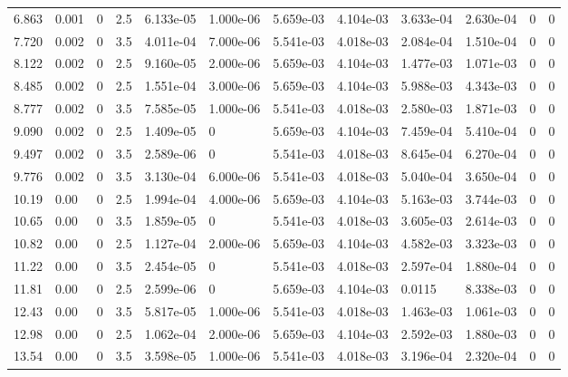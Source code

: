 \documentclass[preview]{standalone}
\begin{document}
{{\begin{tabular}{L{1.2cm}C{1.2cm} C{0.3cm}C{0.5cm} C{1.4cm}C{1.4cm} C{1.4cm}C{1.4cm} C{1.6cm}C{1.6cm} C{1.6cm}C{1.6cm}}
  6.863  &  0.001  & 0     & 2.5 &  6.133e-05  & 1.000e-06  &  5.659e-03&   4.104e-03& 3.633e-04 & 2.630e-04   &  0 & 0  \\ 
  7.720  &  0.002  & 0     & 3.5 &  4.011e-04  & 7.000e-06  &  5.541e-03&   4.018e-03& 2.084e-04 & 1.510e-04   &  0 & 0  \\ 
  8.122  &  0.002  & 0     & 2.5 &  9.160e-05  & 2.000e-06  &  5.659e-03&   4.104e-03& 1.477e-03 & 1.071e-03   &  0 & 0  \\ 
  8.485  &  0.002  & 0     & 2.5 &  1.551e-04  & 3.000e-06  &  5.659e-03&   4.104e-03& 5.988e-03 & 4.343e-03   &  0 & 0  \\ 
  8.777  &  0.002  & 0     & 3.5 &  7.585e-05  & 1.000e-06  &  5.541e-03&   4.018e-03& 2.580e-03 & 1.871e-03   &  0 & 0  \\ 
  9.090  &  0.002  & 0     & 2.5 &  1.409e-05  & 0  &  5.659e-03&   4.104e-03& 7.459e-04 & 5.410e-04   &  0 & 0  \\ 
  9.497  &  0.002  & 0     & 3.5 &  2.589e-06  & 0  &  5.541e-03&   4.018e-03& 8.645e-04 & 6.270e-04   &  0 & 0  \\ 
  9.776  &  0.002  & 0     & 3.5 &  3.130e-04  & 6.000e-06  &  5.541e-03&   4.018e-03& 5.040e-04 & 3.650e-04   &  0 & 0  \\ 
  10.19  &  0.00  & 0     & 2.5 &  1.994e-04  & 4.000e-06  &  5.659e-03&   4.104e-03& 5.163e-03 & 3.744e-03   &  0 & 0  \\ 
  10.65  &  0.00  & 0     & 3.5 &  1.859e-05  & 0  &  5.541e-03&   4.018e-03& 3.605e-03 & 2.614e-03   &  0 & 0  \\ 
  10.82  &  0.00  & 0     & 2.5 &  1.127e-04  & 2.000e-06  &  5.659e-03&   4.104e-03& 4.582e-03 & 3.323e-03   &  0 & 0  \\ 
  11.22  &  0.00  & 0     & 3.5 &  2.454e-05  & 0  &  5.541e-03&   4.018e-03& 2.597e-04 & 1.880e-04   &  0 & 0  \\ 
  11.81  &  0.00  & 0     & 2.5 &  2.599e-06  & 0  &  5.659e-03&   4.104e-03& 0.0115 & 8.338e-03   &  0 & 0  \\ 
  12.43  &  0.00  & 0     & 3.5 &  5.817e-05  & 1.000e-06  &  5.541e-03&   4.018e-03& 1.463e-03 & 1.061e-03   &  0 & 0  \\ 
  12.98  &  0.00  & 0     & 2.5 &  1.062e-04  & 2.000e-06  &  5.659e-03&   4.104e-03& 2.592e-03 & 1.880e-03   &  0 & 0  \\ 
  13.54  &  0.00  & 0     & 3.5 &  3.598e-05  & 1.000e-06  &  5.541e-03&   4.018e-03& 3.196e-04 & 2.320e-04   &  0 & 0  \\ 
\hline 
\end{tabular} 

}}
\end{document}
